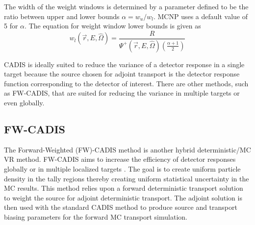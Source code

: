 
The width of the weight windows is determined by a parameter defined to be the
ratio between upper and lower bounds $\alpha =
w_{u}/w_{l}$.  MCNP uses a default value of 5 for $\alpha$.
The equation for weight window lower bounds
is given as 
\begin{equation} \label{eq:3.12}
	w_{l}(\overrightarrow{r}, E, \widehat{\Omega}) = 
	\frac{R}{\Psi^{+}(\overrightarrow{r}, E, \widehat{\Omega})
	(\frac{\alpha + 1}{2})}
\end{equation}

CADIS is ideally suited to reduce the variance of a detector response in a single
target because the source chosen for adjoint transport is the detector response
function corresponding to the detector of interest.  
There are other methods, such as FW-CADIS, that are suited for reducing the variance in 
multiple targets or even globally.

\subsection{FW-CADIS}
The Forward-Weighted (FW)-CADIS method is another hybrid deterministic/MC VR method.
FW-CADIS aims to increase the efficiency of 
detector responses globally or in multiple localized targets \cite{fwcadis}.
The goal is to create uniform particle density in the tally regions thereby
creating uniform statistical uncertainty in the MC results.
This method relies upon a forward deterministic transport solution to
weight the source for adjoint deterministic transport.  The adjoint solution is
then used with the standard CADIS method to produce source and transport
biasing parameters for the forward MC transport simulation.

